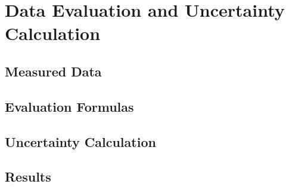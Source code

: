 \chapter{Data Evaluation and Uncertainty Calculation}
\section{Measured Data}
\section{Evaluation Formulas}
\section{Uncertainty Calculation}
\section{Results}